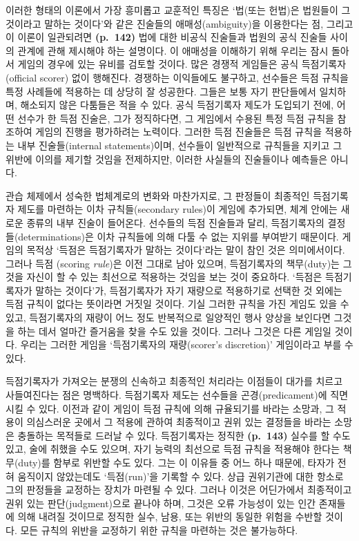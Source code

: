 이러한 형태의 이론에서 가장 흥미롭고 교훈적인 특징은 ‘법(또는 헌법)은
법원들이 그것이라고 말하는 것이다’와 같은 진술들의 애매성(ambiguity)을
이용한다는 점, 그리고 이 이론이 일관되려면 \textbf{(p.~142)} 법에 대한
비공식 진술들과 법원의 공식 진술들 사이의 관계에 관해 제시해야 하는
설명이다. 이 애매성을 이해하기 위해 우리는 잠시 돌아서 게임의 경우에
있는 유비를 검토할 것이다. 많은 경쟁적 게임들은 공식 득점기록자(official
scorer) 없이 행해진다. 경쟁하는 이익들에도 불구하고, 선수들은 득점
규칙을 특정 사례들에 적용하는 데 상당히 잘 성공한다. 그들은 보통 자기
판단들에서 일치하며, 해소되지 않은 다툼들은 적을 수 있다. 공식
득점기록자 제도가 도입되기 전에, 어떤 선수가 한 득점 진술은, 그가
정직하다면, 그 게임에서 수용된 특정 득점 규칙을 참조하여 게임의 진행을
평가하려는 노력이다. 그러한 득점 진술들은 득점 규칙을 적용하는 내부
진술들(internal statements)이며, 선수들이 일반적으로 규칙들을 지키고 그
위반에 이의를 제기할 것임을 전제하지만, 이러한 사실들의 진술들이나
예측들은 아니다.

관습 체제에서 성숙한 법체계로의 변화와 마찬가지로, 그 판정들이 최종적인
득점기록자 제도를 마련하는 이차 규칙들(secondary rules)이 게임에
추가되면, 체계 안에는 새로운 종류의 내부 진술이 들어온다. 선수들의 득점
진술들과 달리, 득점기록자의 결정들(determinations)은 이차 규칙들에 의해
다툴 수 없는 지위를 부여받기 때문이다. 게임의 목적상 ‘득점은
득점기록자가 말하는 것이다’라는 말이 참인 것은 
의미에서이다. 그러나 득점 (scoring \emph{rule})은 이전 그대로
남아 있으며, 득점기록자의 책무(duty)는 그것을 자신이 할 수 있는 최선으로
적용하는 것임을 보는 것이 중요하다. ‘득점은 득점기록자가 말하는
것이다’가, 득점기록자가 자기 재량으로 적용하기로 선택한 것 외에는 득점
규칙이 없다는 뜻이라면 거짓일 것이다. 기실 그러한 규칙을 가진 게임도
있을 수 있고, 득점기록자의 재량이 어느 정도 반복적으로 일양적인 행사
양상을 보인다면 그것을 하는 데서 얼마간 즐거움을 찾을 수도 있을 것이다.
그러나 그것은 다른 게임일 것이다. 우리는 그러한 게임을 ‘득점기록자의
재량(scorer’s discretion)' 게임이라고 부를 수 있다.

득점기록자가 가져오는 분쟁의 신속하고 최종적인 처리라는 이점들이 대가를
치르고 사들여진다는 점은 명백하다. 득점기록자 제도는 선수들을
곤경(predicament)에 직면시킬 수 있다. 이전과 같이 게임이 득점 규칙에
의해 규율되기를 바라는 소망과, 그 적용이 의심스러운 곳에서 그 적용에
관하여 최종적이고 권위 있는 결정들을 바라는 소망은 충돌하는 목적들로
드러날 수 있다. 득점기록자는 정직한 \textbf{(p.~143)} 실수를 할 수도
있고, 술에 취했을 수도 있으며, 자기 능력의 최선으로 득점 규칙을 적용해야
한다는 책무(duty)를 함부로 위반할 수도 있다. 그는 이 이유들 중 어느 하나
때문에, 타자가 전혀 움직이지 않았는데도 ‘득점(run)’을 기록할 수 있다.
상급 권위기관에 대한 항소로 그의 판정들을 교정하는 장치가 마련될 수
있다. 그러나 이것은 어딘가에서 최종적이고 권위 있는 판단(judgment)으로
끝나야 하며, 그것은 오류 가능성이 있는 인간 존재들에 의해 내려질
것이므로 정직한 실수, 남용, 또는 위반의 동일한 위험을 수반할 것이다.
모든 규칙의 위반을 교정하기 위한 규칙을 마련하는 것은 불가능하다.


